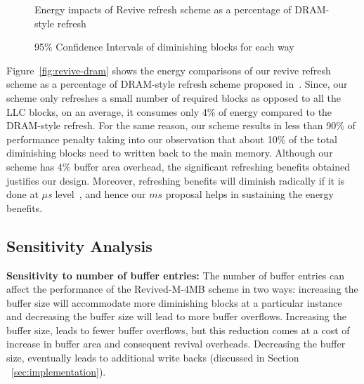 \begin{figure*} %
\begin{minipage}{0.45\textwidth}
\centering
 \caption{\label{fig:revive-dram} Energy impacts of Revive refresh scheme as a percentage of DRAM-style refresh}
\end{minipage}
\hfill %
\begin{minipage}{0.48\textwidth}
 \centering
 \caption{\label{fig:confi} 95\% Confidence Intervals of diminishing blocks for each way}
\end{minipage}
\end{figure*}



Figure~\ref{fig:revive-dram} shows the energy comparisons of our revive refresh scheme as a percentage of
DRAM-style refresh scheme proposed in~\cite{STTRAM:HPCA11}. Since, our scheme only refreshes a small
number of required blocks as opposed to all the LLC blocks, on an average, it consumes only 4\% of energy compared
to the DRAM-style refresh. For the same reason, our scheme results in less than 90\% of performance penalty taking into our observation that about 10\% of the total diminishing blocks need to written back to the main memory. Although our scheme has 4\% buffer area overhead, the significant refreshing benefits obtained justifies our design. Moreover, refreshing benefits will diminish radically if it is done at {\it $\mu$s} level~\cite{STTRAM:HPCA11}, and hence our $ms$ proposal helps in sustaining the energy benefits.


\subsection{Sensitivity Analysis}
\noindent\textbf{Sensitivity to number of buffer entries:}
The number of buffer entries can affect the performance of the Revived-M-4MB scheme in two ways: increasing the
buffer size will accommodate more diminishing blocks at a particular instance and decreasing the buffer size will
lead to more buffer overflows. Increasing the buffer size, leads to fewer buffer overflows,
but this reduction comes at a cost of increase in buffer area and consequent revival overheads. Decreasing the buffer size, eventually leads to additional write backs (discussed in Section ~\ref{sec:implementation}).





